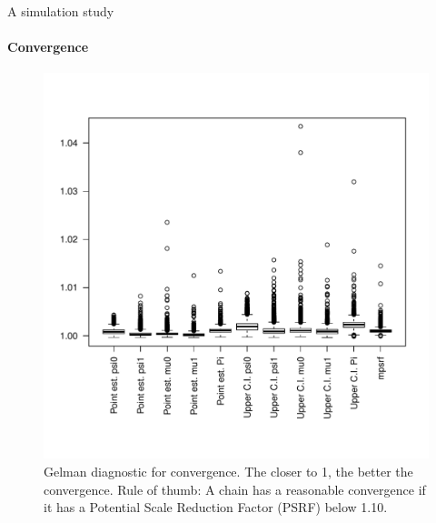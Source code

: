 \documentclass[9pt,ignorenonframetext,aspectratio=169]{beamer}
\begin{document}
\begin{frame}[t,label=sim-convergence]{A simulation study}

\framesubtitle{Convergence \hyperlink{sim-setup}{}}

\begin{figure}
\centering
\includegraphics[width=.4\linewidth, trim={0 1.5cm 0 2cm},clip]{gelmans_right_prior.pdf}
\caption{Gelman diagnostic for convergence. The closer to 1, the better the convergence. Rule of thumb: A chain has a reasonable convergence if it has a Potential Scale Reduction Factor (PSRF) below 1.10.}
\end{figure}

\end{frame}
\end{document}
